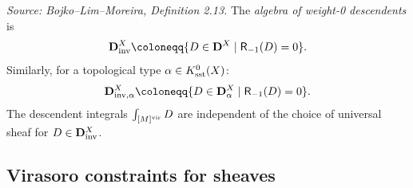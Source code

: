 
\begin{definition}[WeightZeroDescendents]
  \label{def:weight-zero}
  \textit{Source: Bojko--Lim--Moreira, Definition 2.13.}
  The \emph{algebra of weight-0 descendents} is
  \[\BD^X_\inv \coloneqq \{D \in \BD^X \mid \bR_{-1}(D) = 0\}.\]
  Similarly, for a topological type \(\alpha \in K^0_{\mathrm{sst}}(X)\):
  \[\BD^X_{\inv,\alpha} \coloneqq \{D \in \BD^X_\alpha \mid \bR_{-1}(D) = 0\}.\]
  The descendent integrals \(\int_{[M]^{\mathrm{vir}}} D\) are independent of the choice of
  universal sheaf for \(D \in \mathbf{D}^X_{\mathrm{inv}}\).
\end{definition}

\subsection{Virasoro constraints for sheaves}



